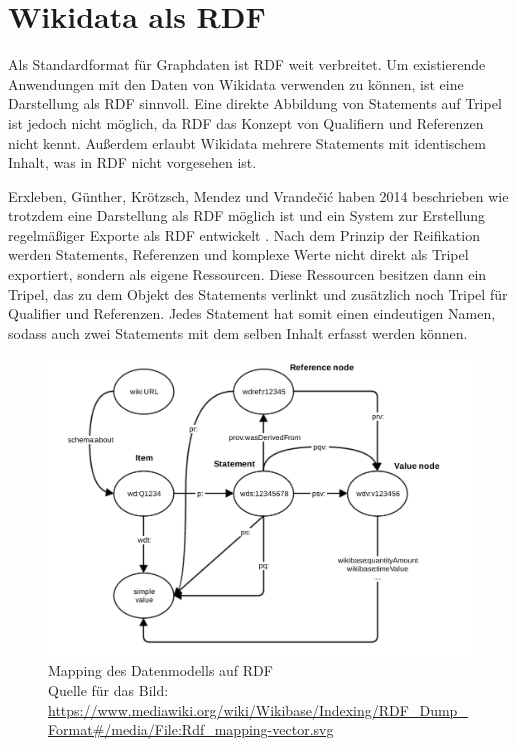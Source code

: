 \section{Wikidata als RDF}
Als Standardformat für Graphdaten ist RDF weit verbreitet.
Um existierende Anwendungen mit den Daten von Wikidata verwenden zu können, ist eine Darstellung als RDF sinnvoll.
Eine direkte Abbildung von Statements auf Tripel ist jedoch nicht möglich, da RDF das Konzept von Qualifiern und Referenzen nicht kennt.
Außerdem erlaubt Wikidata mehrere Statements mit identischem Inhalt, was in RDF nicht vorgesehen ist.

Erxleben, Günther, Krötzsch, Mendez und Vrandečić haben 2014 beschrieben wie trotzdem eine Darstellung als RDF möglich ist und ein System zur Erstellung regelmäßiger Exporte als RDF entwickelt \cite{wikidata-rdf-export}.
Nach dem Prinzip der Reifikation werden Statements, Referenzen und komplexe Werte nicht direkt als Tripel exportiert, sondern als eigene Ressourcen. 
Diese Ressourcen besitzen dann ein Tripel, das zu dem Objekt des Statements verlinkt und zusätzlich noch Tripel für Qualifier und Referenzen.
Jedes Statement hat somit einen eindeutigen Namen, sodass auch zwei Statements mit dem selben Inhalt erfasst werden können.
\begin{figure}
  \includegraphics[width=\linewidth]{pics/Rdf_mapping}
  \caption{Mapping des Datenmodells auf RDF \\ Quelle für das Bild: \url{https://www.mediawiki.org/wiki/Wikibase/Indexing/RDF_Dump_Format\#/media/File:Rdf_mapping-vector.svg}}
  \label{fig:rdf-mapping}
\end{figure}

